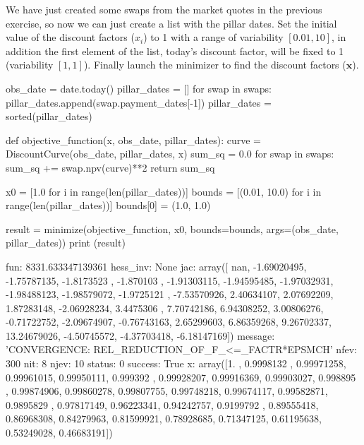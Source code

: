 \cprotEnv\begin{solution}
We have just created some swaps from the market quotes in the previous exercise, so now we can just create a list with the pillar dates.
Set the initial value of the discount factors ($x_i$) to 1 with a range of variability $[ 0.01, 10]$, in addition the first element of the list, today's discount factor, will be fixed to 1 (variability $[1, 1]$).
Finally launch the minimizer to find the discount factors ($\mathbf{x}$).


\begin{ipython}
obs_date = date.today()
pillar_dates = []
for swap in swaps:
    pillar_dates.append(swap.payment_dates[-1])
    pillar_dates = sorted(pillar_dates)

def objective_function(x, obs_date, pillar_dates):
    curve = DiscountCurve(obs_date, pillar_dates, x)
    sum_sq = 0.0
    for swap in swaps:
        sum_sq += swap.npv(curve)**2
    return sum_sq

x0 = [1.0 for i in range(len(pillar_dates))]
bounds = [(0.01, 10.0) for i in range(len(pillar_dates))]
bounds[0] = (1.0, 1.0)

result = minimize(objective_function, x0, bounds=bounds,
                  args=(obs_date, pillar_dates))
print (result)
\end{ipython}
\begin{ioutput}
      fun: 8331.633347139361
 hess_inv: None
      jac: array([        nan, -1.69020495, -1.75787135, -1.8173523 , -1.870103  ,
       -1.91303115, -1.94595485, -1.97032931, -1.98488123, -1.98579072,
       -1.9725121 , -7.53570926,  2.40634107,  2.07692209,  1.87283148,
       -2.06928234,  3.4475306 ,  7.70742186,  6.94308252,  3.00806276,
       -0.71722752, -2.09674907, -0.76743163,  2.65299603,  6.86359268,
        9.26702337, 13.24679026, -4.50745572, -4.37703418, -6.18147169])
  message: 'CONVERGENCE: REL_REDUCTION_OF_F_<=_FACTR*EPSMCH'
     nfev: 300
      nit: 8
     njev: 10
   status: 0
  success: True
        x: array([1.        , 0.9998132 , 0.99971258, 0.99961015, 0.99950111,
       0.999392  , 0.99928207, 0.99916369, 0.99903027, 0.998895  ,
       0.99874906, 0.99860278, 0.99807755, 0.99748218, 0.99674117,
       0.99582871, 0.9895829 , 0.97817149, 0.96223341, 0.94242757,
       0.9199792 , 0.89555418, 0.86968308, 0.84279963, 0.81599921,
       0.78928685, 0.71347125, 0.61195638, 0.53249028, 0.46683191])
\end{ioutput}

\end{solution}

